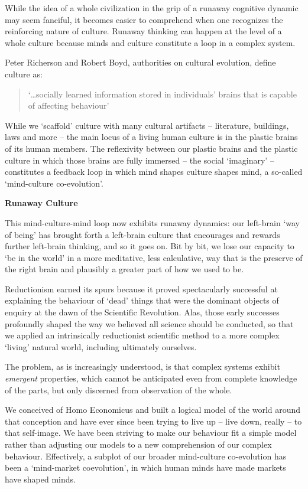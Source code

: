 \documentclass[
]{book}
\begin{document}
While the idea of a whole civilization in the grip of a runaway cognitive dynamic may seem fanciful, it becomes easier to comprehend when one recognizes the reinforcing nature of culture. Runaway thinking can happen at the level of a whole culture because minds and culture constitute a loop in a complex system.

Peter Richerson and Robert Boyd, authorities on cultural evolution, define culture as:

\begin{quote}
`\ldots socially learned information stored in individuals' brains that is capable of affecting behaviour'
\end{quote}

While we `scaffold' culture with many cultural artifacts -- literature, buildings, laws and more -- the main locus of a living human culture is in the plastic brains of its human members. The reflexivity between our plastic brains and the plastic culture in which those brains are fully immersed -- the social `imaginary' -- constitutes a feedback loop in which mind shapes culture shapes mind, a so-called `mind-culture co-evolution'.

\textbf{Runaway Culture}

This mind-culture-mind loop now exhibits runaway dynamics: our left-brain `way of being' has brought forth a left-brain culture that encourages and rewards further left-brain thinking, and so it goes on. Bit by bit, we lose our capacity to `be in the world' in a more meditative, less calculative, way that is the preserve of the right brain and plausibly a greater part of how we used to be.

Reductionism earned its spurs because it proved spectacularly successful at explaining the behaviour of `dead' things that were the dominant objects of enquiry at the dawn of the Scientific Revolution. Alas, those early successes profoundly shaped the way we believed all science should be conducted, so that we applied an intrinsically reductionist scientific method to a more complex `living' natural world, including ultimately ourselves.

The problem, as is increasingly understood, is that complex systems exhibit \emph{emergent} properties, which cannot be anticipated even from complete knowledge of the parts, but only discerned from observation of the whole.

We conceived of Homo Economicus and built a logical model of the world around that conception and have ever since been trying to live up -- live down, really -- to that self-image. We have been striving to make our behaviour fit a simple model rather than adjusting our models to a new comprehension of our complex behaviour. Effectively, a subplot of our broader mind-culture co-evolution has been a `mind-market coevolution', in which human minds have made markets have shaped minds.
\end{document}
